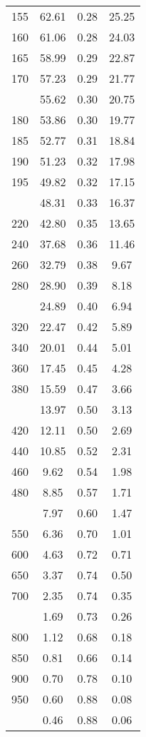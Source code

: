 \begin{table}[ht]
\begin{tabular}{lccc}
  155 & 62.61 & 0.28 & 25.25 \\ 
  160 & 61.06 & 0.28 & 24.03 \\ 
  165 & 58.99 & 0.29 & 22.87 \\ 
  170 & 57.23 & 0.29 & 21.77 \\ 
   \addlinespace
175 & 55.62 & 0.30 & 20.75 \\ 
  180 & 53.86 & 0.30 & 19.77 \\ 
  185 & 52.77 & 0.31 & 18.84 \\ 
  190 & 51.23 & 0.32 & 17.98 \\ 
  195 & 49.82 & 0.32 & 17.15 \\ 
   \addlinespace
200 & 48.31 & 0.33 & 16.37 \\ 
  220 & 42.80 & 0.35 & 13.65 \\ 
  240 & 37.68 & 0.36 & 11.46 \\ 
  260 & 32.79 & 0.38 & 9.67 \\ 
  280 & 28.90 & 0.39 & 8.18 \\ 
   \addlinespace
300 & 24.89 & 0.40 & 6.94 \\ 
  320 & 22.47 & 0.42 & 5.89 \\ 
  340 & 20.01 & 0.44 & 5.01 \\ 
  360 & 17.45 & 0.45 & 4.28 \\ 
  380 & 15.59 & 0.47 & 3.66 \\ 
   \addlinespace
400 & 13.97 & 0.50 & 3.13 \\ 
  420 & 12.11 & 0.50 & 2.69 \\ 
  440 & 10.85 & 0.52 & 2.31 \\ 
  460 & 9.62 & 0.54 & 1.98 \\ 
  480 & 8.85 & 0.57 & 1.71 \\ 
   \addlinespace
500 & 7.97 & 0.60 & 1.47 \\ 
  550 & 6.36 & 0.70 & 1.01 \\ 
  600 & 4.63 & 0.72 & 0.71 \\ 
  650 & 3.37 & 0.74 & 0.50 \\ 
  700 & 2.35 & 0.74 & 0.35 \\ 
   \addlinespace
750 & 1.69 & 0.73 & 0.26 \\ 
  800 & 1.12 & 0.68 & 0.18 \\ 
  850 & 0.81 & 0.66 & 0.14 \\ 
  900 & 0.70 & 0.78 & 0.10 \\ 
  950 & 0.60 & 0.88 & 0.08 \\ 
   \addlinespace
1000 & 0.46 & 0.88 & 0.06 \\ 
   \bottomrule
\end{tabular}
\end{table}

